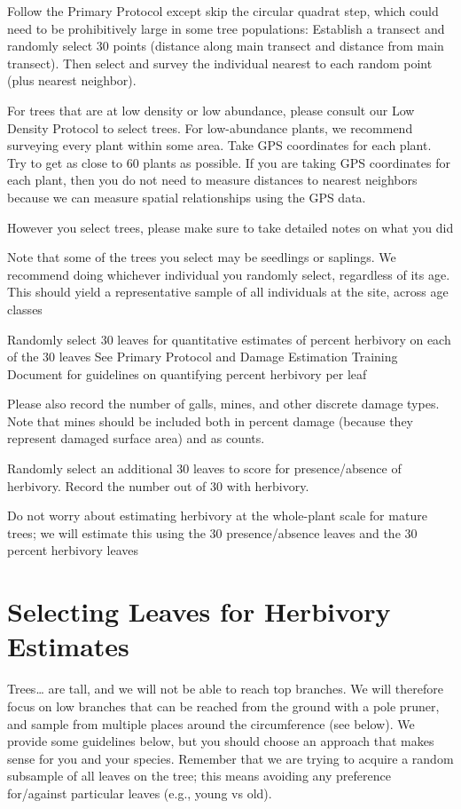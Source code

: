 \documentclass[
  letterpaper,
  DIV=11,
  numbers=noendperiod]{scrreprt}
\begin{document}
Follow the Primary Protocol except skip the circular quadrat step, which
could need to be prohibitively large in some tree populations: Establish
a transect and randomly select 30 points (distance along main transect
and distance from main transect). Then select and survey the individual
nearest to each random point (plus nearest neighbor).

For trees that are at low density or low abundance, please consult our
Low Density Protocol to select trees. For low-abundance plants, we
recommend surveying every plant within some area. Take GPS coordinates
for each plant. Try to get as close to 60 plants as possible. If you are
taking GPS coordinates for each plant, then you do not need to measure
distances to nearest neighbors because we can measure spatial
relationships using the GPS data.

However you select trees, please make sure to take detailed notes on
what you did

Note that some of the trees you select may be seedlings or saplings. We
recommend doing whichever individual you randomly select, regardless of
its age. This should yield a representative sample of all individuals at
the site, across age classes

Randomly select 30 leaves for quantitative estimates of percent
herbivory on each of the 30 leaves See Primary Protocol and Damage
Estimation Training Document for guidelines on quantifying percent
herbivory per leaf

Please also record the number of galls, mines, and other discrete damage
types. Note that mines should be included both in percent damage
(because they represent damaged surface area) and as counts.

Randomly select an additional 30 leaves to score for presence/absence of
herbivory. Record the number out of 30 with herbivory.

Do not worry about estimating herbivory at the whole-plant scale for
mature trees; we will estimate this using the 30 presence/absence leaves
and the 30 percent herbivory leaves

\section{Selecting Leaves for Herbivory
Estimates}\label{selecting-leaves-for-herbivory-estimates}

Trees\ldots{} are tall, and we will not be able to reach top branches.
We will therefore focus on low branches that can be reached from the
ground with a pole pruner, and sample from multiple places around the
circumference (see below). We provide some guidelines below, but you
should choose an approach that makes sense for you and your species.
Remember that we are trying to acquire a random subsample of all leaves
on the tree; this means avoiding any preference for/against particular
leaves (e.g., young vs old).
\end{document}
